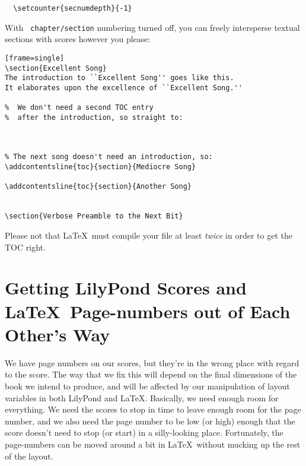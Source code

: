 \documentclass[../../LilyPond-Tutorials]{subfiles}
\begin{document}
\begin{verbatim}  \setcounter{secnumdepth}{-1} \end{verbatim}

With \texttt{ chapter/section} numbering turned off, you can freely intersperse textual sections with scores however you please:

\begin{verbatim}[frame=single] 
\section{Excellent Song} 
The introduction to ``Excellent Song'' goes like this. 
It elaborates upon the excellence of ``Excellent Song.'' 

%  We don't need a second TOC entry  
%  after the introduction, so straight to: 



% The next song doesn't need an introduction, so: 
\addcontentsline{toc}{section}{Mediocre Song} 
 
\addcontentsline{toc}{section}{Another Song} 


\section{Verbose Preamble to the Next Bit} \end{verbatim}

Please not that \LaTeX\ must compile your file at least \textit{twice} in order to get the TOC right. 

\section*{Getting LilyPond Scores and \LaTeX\ Page-numbers out of Each Other's Way}

We have page numbers on our scores, but they're in the wrong place with regard to the score. The way that we fix this will depend on the final dimensions of the book we intend to produce, and will be affected by our manipulation of layout variables in both LilyPond and \LaTeX. Basically, we need enough room for everything. We need the scores to stop in time to leave enough room for the page number, and we also need the page number to be low (or high) enough that the score doesn’t need to stop (or start) in a silly-looking place. Fortunately, the page-numbers can be moved around a bit in \LaTeX\ without mucking up the rest of the layout.
\end{document}
